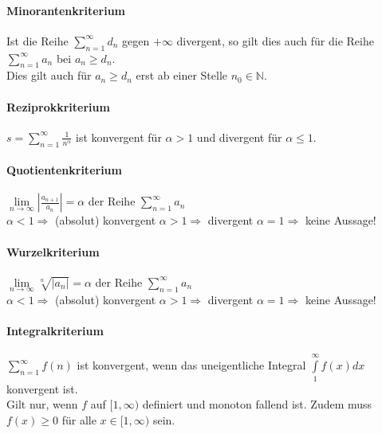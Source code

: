 \paragraph{Minorantenkriterium}
Ist die Reihe $ \sum\limits_{n=1}^{\infty} d_n $ gegen $+\infty$ divergent, so gilt dies auch für die Reihe $ \sum\limits_{n=1}^{\infty} a_n $ 
bei $a_n \geq d_n$. \\ Dies gilt auch für $a_n \geq d_n$ erst ab einer Stelle $n_0 \in \mathbb{N}$.

\paragraph{Reziprokkriterium}
$ s = \sum\limits_{n=1}^{\infty} \frac{1}{n^\alpha} $ ist konvergent für $\alpha > 1$ und divergent für $\alpha \leq 1$.

\paragraph{Quotientenkriterium}
$ \lim\limits_{n \to \infty} \left|\frac{a_{n+1}}{a_n}\right| = \alpha $ der Reihe $ \sum\limits_{n=1}^{\infty} a_n $ \\
$\alpha < 1 \Rightarrow$ (absolut) konvergent \hspace{3cm}
$\alpha > 1 \Rightarrow$ divergent \hspace{4cm} 
$\alpha = 1 \Rightarrow$ keine Aussage!

\paragraph{Wurzelkriterium}
$ \lim\limits_{n \to \infty} \sqrt[n]{\left|a_n\right|} = \alpha $ der Reihe $ \sum\limits_{n=1}^{\infty} a_n $ \\
$\alpha < 1 \Rightarrow$ (absolut) konvergent\hspace{3cm}
$\alpha > 1 \Rightarrow$ divergent \hspace{4cm} 
$\alpha = 1 \Rightarrow$ keine Aussage!

\paragraph{Integralkriterium}
$ \sum\limits_{n=1}^{\infty} f(n) $ ist konvergent, wenn das uneigentliche Integral $ \int\limits_{1}^{\infty} f(x) dx $ konvergent ist. \\
Gilt nur, wenn $f$ auf $ [1, \infty) $ definiert und monoton fallend ist. Zudem muss $ f(x) \geq 0 $ für alle $x \in [1, \infty)$ sein.
 
